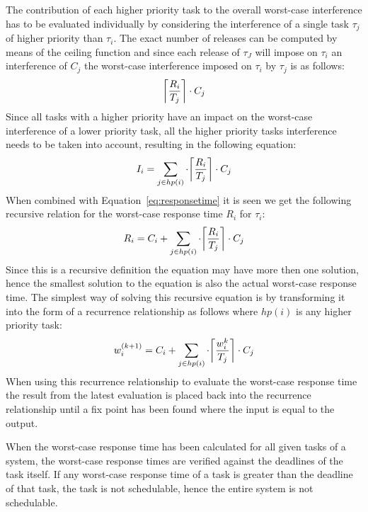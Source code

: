 The contribution of each higher priority task to the overall worst-case interference has to be evaluated individually by considering the interference of a single task $\tau_j$ of higher priority than $\tau_i$.
The exact number of releases can be computed by means of the ceiling function and since each release of $\tau_J$ will impose on $\tau_i$ an interference of $C_j$ the worst-case interference imposed on $\tau_i$ by $\tau_j$ is as follows:
\begin{equation}
\ceil*{\frac{R_i}{T_j}} \cdot C_j
\end{equation}
Since all tasks with a higher priority have an impact on the worst-case interference of a lower priority task, all the higher priority tasks interference needs to be taken into account, resulting in the following equation:
\begin{equation}
I_i = \sum_{j\in hp(i)} \cdot \ceil*{\frac{R_i}{T_j}} \cdot C_j
\end{equation}
When combined with Equation~\ref{eq:responsetime} it is seen we get the following recursive relation for the worst-case response time $R_i$ for $\tau_i$:
\begin{equation}
R_i = C_i + \sum_{j\in hp(i)} \cdot \ceil*{\frac{R_i}{T_j}} \cdot C_j
\end{equation}
Since this is a recursive definition the equation may have more then one solution, hence the smallest solution to the equation is also the actual worst-case response time. 
The simplest way of solving this recursive equation is by transforming it into the form of a recurrence relationship as follows where $hp(i)$ is any higher priority task:
\begin{equation}
w^{(k+1)}_{i} = C_i + \sum_{j\in hp(i)} \cdot \ceil*{\frac{w^{k}_{i}}{T_j}} \cdot C_j
\end{equation}
When using this recurrence relationship to evaluate the worst-case response time the result from the latest evaluation is placed back into the recurrence relationship until a fix point has been found where the input is equal to the output. 

When the worst-case response time has been calculated for all given tasks of a system, the worst-case response times are verified against the deadlines of the task itself.
If any worst-case response time of a task is greater than the deadline of that task, the task is not schedulable, hence the entire system is not schedulable. 
